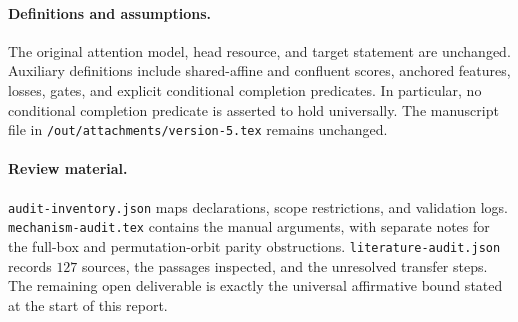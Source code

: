 \documentclass[11pt]{article}
\begin{document}
\paragraph{Definitions and assumptions.}
The original attention model, head resource, and target statement are
unchanged. Auxiliary definitions include shared-affine and confluent
scores, anchored features, losses, gates, and explicit conditional
completion predicates. In particular, no conditional completion
predicate is asserted to hold universally. The manuscript file in
\texttt{/out/attachments/version-5.tex} remains unchanged.

\paragraph{Review material.}
\texttt{audit-inventory.json} maps declarations, scope restrictions,
and validation logs. \texttt{mechanism-audit.tex} contains the manual
arguments, with separate notes for the full-box and permutation-orbit
parity obstructions. \texttt{literature-audit.json} records $127$
sources, the passages inspected, and the unresolved transfer steps.
The remaining open deliverable is exactly the universal affirmative
bound stated at the start of this report.
\end{document}
